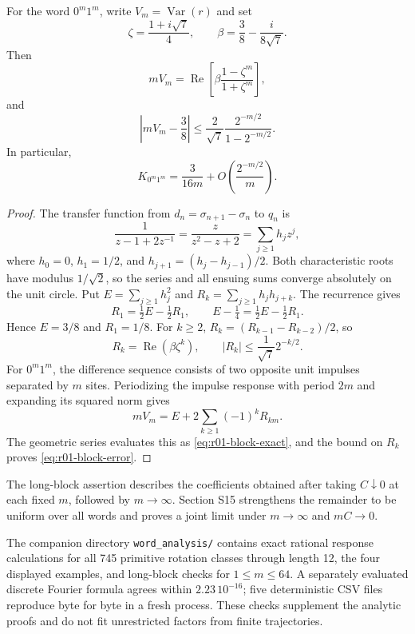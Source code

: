 \begin{proposition}\label{prop:r01-blocks}
For the word $0^m1^m$, write $V_m=\operatorname{Var}(r)$ and set
\[
 \zeta=\frac{1+i\sqrt7}{4},\qquad
 \beta=\frac38-\frac{i}{8\sqrt7}.
\]
Then
\begin{equation}\label{eq:r01-block-exact}
 mV_m=\operatorname{Re}\left[
   \beta\frac{1-\zeta^m}{1+\zeta^m}\right],
\end{equation}
and
\begin{equation}\label{eq:r01-block-error}
 \left|mV_m-\frac38\right|
 \le\frac{2}{\sqrt7}\frac{2^{-m/2}}{1-2^{-m/2}}.
\end{equation}
In particular,
\[
 K_{0^m1^m}=\frac{3}{16m}
       +O\!\left(\frac{2^{-m/2}}m\right).
\]
\end{proposition}
\begin{proof}
The transfer function from $d_n=\sigma_{n+1}-\sigma_n$ to $q_n$ is
\[
 \frac1{z-1+2z^{-1}}=\frac{z}{z^2-z+2}
       =\sum_{j\ge1}h_jz^j,
\]
where $h_0=0$, $h_1=1/2$, and
$h_{j+1}=(h_j-h_{j-1})/2$. Both characteristic roots have modulus
$1/\sqrt2$, so the series and all ensuing sums converge absolutely on
the unit circle. Put $E=\sum_{j\ge1}h_j^2$ and
$R_k=\sum_{j\ge1}h_jh_{j+k}$. The recurrence gives
\[
 R_1=\tfrac12E-\tfrac12R_1,\qquad
 E-\tfrac14=\tfrac12E-\tfrac12R_1.
\]
Hence $E=3/8$ and $R_1=1/8$. For $k\ge2$,
$R_k=(R_{k-1}-R_{k-2})/2$, so
\[
 R_k=\operatorname{Re}(\beta\zeta^k),\qquad
 |R_k|\le\frac1{\sqrt7}2^{-k/2}.
\]
For $0^m1^m$, the difference sequence consists of two opposite unit
impulses separated by $m$ sites. Periodizing the impulse response with
period $2m$ and expanding its squared norm gives
\[
 mV_m=E+2\sum_{k\ge1}(-1)^kR_{km}.
\]
The geometric series evaluates this as \eqref{eq:r01-block-exact},
and the bound on $R_k$ proves \eqref{eq:r01-block-error}.
\end{proof}
The long-block assertion describes the coefficients obtained after taking
$C\downarrow0$ at each fixed $m$, followed by $m\to\infty$.
Section S15 strengthens the remainder to be uniform over all words and proves a joint limit under $m\to\infty$ and $mC\to0$.

The companion directory \texttt{word\_analysis/} contains exact rational response calculations for all 745 primitive rotation classes through length 12, the four displayed examples, and long-block checks for $1\le m\le64$. A separately evaluated discrete Fourier formula agrees within $2.23\,10^{-16}$; five deterministic CSV files reproduce byte for byte in a fresh process. These checks supplement the analytic proofs and do not fit unrestricted factors from finite trajectories.
